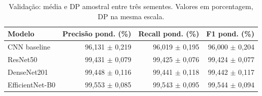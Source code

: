 \begin{table}[htbp]
\centering
\caption{Validação: média e DP amostral entre três sementes. Valores em porcentagem, DP na mesma escala.}
\label{tab:validation-weighted}
\small
\begin{tabular}{lrrr}
\toprule
Modelo & Precisão pond. (\%) & Recall pond. (\%) & F1 pond. (\%) \\
\midrule
CNN baseline & 96,131 $\pm$ 0,219 & 96,019 $\pm$ 0,195 & 96,000 $\pm$ 0,204 \\
ResNet50 & 99,431 $\pm$ 0,079 & 99,425 $\pm$ 0,076 & 99,424 $\pm$ 0,077 \\
DenseNet201 & 99,448 $\pm$ 0,116 & 99,441 $\pm$ 0,118 & 99,442 $\pm$ 0,117 \\
EfficientNet-B0 & 99,553 $\pm$ 0,085 & 99,543 $\pm$ 0,095 & 99,544 $\pm$ 0,094 \\
\bottomrule
\end{tabular}
\end{table}

